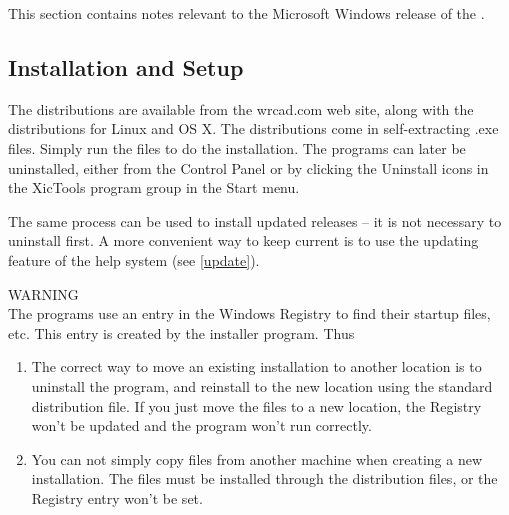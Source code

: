 This section contains notes relevant to the Microsoft Windows
release of the {\XicTools}.

\subsection{Installation and Setup}

%

The distributions are available from the {\vt wrcad.com} web site,
along with the distributions for Linux and OS X.  The distributions
come in self-extracting {\vt .exe} files.  Simply run the files to do
the installation.  The programs can later be uninstalled, either from
the {\cb Control Panel} or by clicking the {\cb Uninstall} icons in
the {\cb XicTools} program group in the {\cb Start} menu.

The same process can be used to install updated releases -- it is not
necessary to uninstall first.  A more convenient way to keep current
is to use the updating feature of the help system (see \ref{update}).

WARNING\\
The programs use an entry in the Windows Registry to find their
startup files, etc.  This entry is created by the installer program. 
Thus
\begin{enumerate}
\item{The correct way to move an existing installation to another
location is to uninstall the program, and reinstall to the new
location using the standard distribution file.  If you just move the
files to a new location, the Registry won't be updated and the program
won't run correctly.}

\item{You can not simply copy files from another machine when creating
a new installation.  The files must be installed through the
distribution files, or the Registry entry won't be set.}
\end{enumerate}

